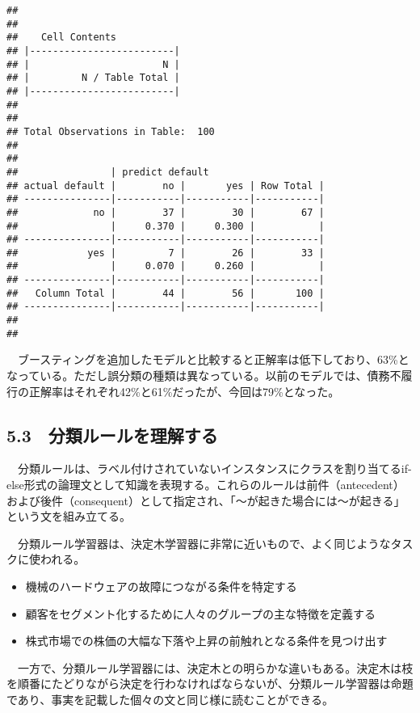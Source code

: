 \documentclass[
]{article}
\providecommand{\tightlist}{%
  \setlength{\itemsep}{0pt}\setlength{\parskip}{0pt}}
\begin{document}
\begin{verbatim}
## 
##  
##    Cell Contents
## |-------------------------|
## |                       N |
## |         N / Table Total |
## |-------------------------|
## 
##  
## Total Observations in Table:  100 
## 
##  
##                | predict default 
## actual default |        no |       yes | Row Total | 
## ---------------|-----------|-----------|-----------|
##             no |        37 |        30 |        67 | 
##                |     0.370 |     0.300 |           | 
## ---------------|-----------|-----------|-----------|
##            yes |         7 |        26 |        33 | 
##                |     0.070 |     0.260 |           | 
## ---------------|-----------|-----------|-----------|
##   Column Total |        44 |        56 |       100 | 
## ---------------|-----------|-----------|-----------|
## 
## 
\end{verbatim}

　ブースティングを追加したモデルと比較すると正解率は低下しており、63\%となっている。ただし誤分類の種類は異なっている。以前のモデルでは、債務不履行の正解率はそれぞれ42\%と61\%だったが、今回は79\%となった。

\subsection{5.3　分類ルールを理解する}\label{ux5206ux985eux30ebux30fcux30ebux3092ux7406ux89e3ux3059ux308b}

　分類ルールは、ラベル付けされていないインスタンスにクラスを割り当てるif-else形式の論理文として知識を表現する。これらのルールは前件（antecedent）および後件（consequent）として指定され、「～が起きた場合には～が起きる」という文を組み立てる。

　分類ルール学習器は、決定木学習器に非常に近いもので、よく同じようなタスクに使われる。

\begin{itemize}
\tightlist
\item
  機械のハードウェアの故障につながる条件を特定する
\item
  顧客をセグメント化するために人々のグループの主な特徴を定義する
\item
  株式市場での株価の大幅な下落や上昇の前触れとなる条件を見つけ出す
\end{itemize}

　一方で、分類ルール学習器には、決定木との明らかな違いもある。決定木は枝を順番にたどりながら決定を行わなければならないが、分類ルール学習器は命題であり、事実を記載した個々の文と同じ様に読むことができる。
\end{document}
